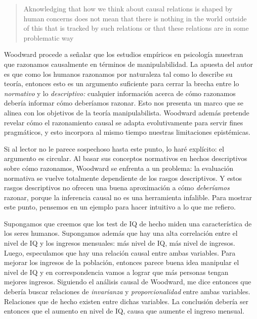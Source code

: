  \begin{quote}
    Aknowledging that how we think about causal relations is
    shaped by human concerns does not mean that there is
    nothing in the world outside of this that is tracked by
    such relations or that these relations are  in some problematic way
    \parencite[p.~12]{caushuman}
  \end{quote}


Woodward procede a señalar que los estudios empíricos en
psicología muestran que razonamos causalmente en términos de
manipulabilidad. La apuesta del autor es que como los
humanos razonamos por naturaleza tal como lo describe su
teoría, entonces esto es un argumento suficiente para cerrar
la brecha entre lo \emph{normativo} y lo \emph{descriptivo:}
cualquier información acerca de cómo razonamos debería
informar cómo deberíamos razonar. Esto nos presenta un
marco que se alinea con los objetivos de la teoría
manipulabilista. Woodward además pretende revelar cómo el
razonamiento causal se adapta evolutivamente para servir
fines pragmáticos, y esto incorpora al mismo tiempo
nuestras limitaciones epistémicas.

Si al lector no le parece sospechoso hasta este punto, lo
haré explícito: el argumento es circular. Al basar sus
conceptos normativos en hechos descriptivos sobre cómo
razonamos, Woodward se enfrenta a un problema: la evaluación
normativa se vuelve totalmente dependiente de los rasgos
descriptivos. Y estos rasgos descriptivos no ofrecen una
buena aproximación a cómo \emph{deberíamos} razonar, porque
la inferencia causal no es una herramienta infalible. Para
mostrar este punto, pensemos en un ejemplo para hacer
intuitivo a lo que me refiero. 

Supongamos que creemos que los test de IQ de hecho miden una
característica de los seres humanos. Supongamos además que
hay una alta correlación entre el nivel de IQ y los ingresos
mensuales: más nivel de IQ, más nivel de ingresos. Luego,
especulamos que hay una relación causal entre ambas
variables. Para mejorar los ingresos de la población,
entonces parece buena idea manipular el nivel de IQ y en
correspondencia vamos a lograr que más personas tengan
mejores ingresos. Siguiendo el análisis causal de Woodward,
me dice entonces que debería buscar relaciones de
\emph{invarianza} y \emph{proporcionalidad} entre ambas
variables. Relaciones que de hecho existen entre dichas
variables. La conclusión debería ser entonces que el aumento
en nivel de IQ, causa que aumente el ingreso mensual.   

